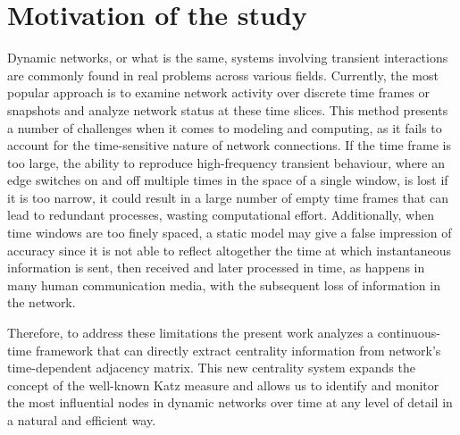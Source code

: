 \section{Motivation of the study}
\label{sec:motiv}
Dynamic networks, or what is the same, systems involving transient interactions are commonly found in real problems across various fields. Currently, the most popular approach is to examine network activity over discrete time frames or snapshots and analyze network status at these time slices. This method presents a number of challenges when it comes to modeling and computing, as it fails to account for the time-sensitive nature of network connections. If the time frame is too large, the ability to reproduce high-frequency transient behaviour, where an edge switches on and off multiple times in the space of a single window, is lost if it is too narrow, it could result in a large number of empty time frames that can lead to redundant processes, wasting computational effort. Additionally, when time windows are too finely spaced, a static model may give a false impression of accuracy since it is not able to reflect altogether the time at which instantaneous information is sent, then received and later processed in time, as  happens in many human communication media, with the subsequent loss of information in the network.

Therefore, to address these limitations the present work  analyzes a continuous-time framework  that can directly extract centrality information from  network's time-dependent adjacency matrix. This new centrality system expands the concept of the well-known Katz measure and  allows us to identify and monitor the most influential nodes in dynamic networks over time at any level of detail in a  natural and efficient way.

